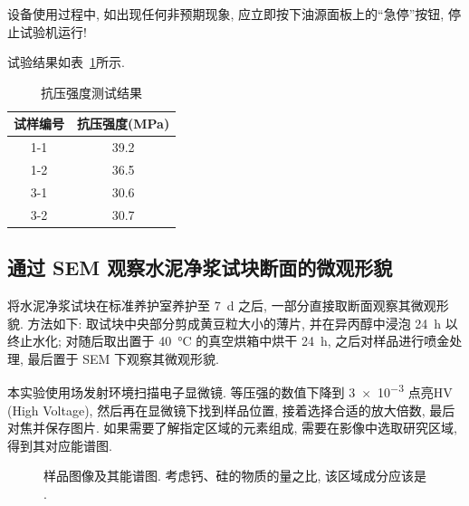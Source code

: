设备使用过程中, 如出现任何非预期现象, 应立即按下油源面板上的“急停”按钮, 停止试验机运行! 

试验结果如表~\ref{tbl:compressive_strength_test}所示.

\begin{table}[!t]
    \centering
    \caption{抗压强度测试结果}
    \begin{tabular}{|c|c|}
    \hline
    试样编号 & 抗压强度(\si{\mega\pascal}) \\ \hline
    1-1  & 39.2      \\ \hline
    1-2  & 36.5      \\ \hline
    3-1  & 30.6      \\ \hline
    3-2  & 30.7      \\ \hline
    \end{tabular}
    \label{tbl:compressive_strength_test}
\end{table}

\subsection{通过 SEM 观察水泥净浆试块断面的微观形貌}

将水泥净浆试块在标准养护室养护至 \SI{7}{\day} 之后, 一部分直接取断面观察其微观形貌.
方法如下: 取试块中央部分剪成黄豆粒大小的薄片, 并在异丙醇中浸泡 \SI{24}{\hour} 以终止水化; 对随后取出置于 \SI{40}{\degreeCelsius} 的真空烘箱中烘干 \SI{24}{\hour}, 之后对样品进行喷金处理, 最后置于 SEM 下观察其微观形貌. 

本实验使用场发射环境扫描电子显微镜. 等压强的数值下降到 \num{3e-3} 点亮HV (High Voltage), 然后再在显微镜下找到样品位置, 接着选择合适的放大倍数, 最后对焦并保存图片. 
如果需要了解指定区域的元素组成, 需要在影像中选取研究区域, 得到其对应能谱图.

\begin{figure}
    \centering
     \quad
    \caption{样品图像及其能谱图. 考虑钙、硅的物质的量之比, 该区域成分应该是  .}
\end{figure}

